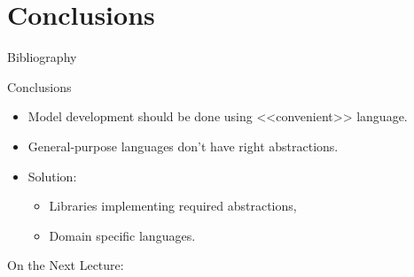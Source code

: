 
\section*{Conclusions}

\begin{frame}[allowframebreaks]{Bibliography}
  \nocite{Hadjiyiannis-ISDL}
  \nocite{Schliebusch-LISA}
  \nocite{Nikhil-BSV}
  \printbibliography
\end{frame}

\begin{frame}{Conclusions}
  \begin{itemize}
    \item Model development should be done using <<convenient>> language.
    \item General-purpose languages don't have right abstractions.
    \item Solution:
    \begin{itemize}
      \item Libraries implementing required abstractions,
      \item Domain specific languages.
    \end{itemize}
  \end{itemize}
\end{frame}

\begin{frame}{On the Next Lecture:}
\end{frame}

\finalslide



